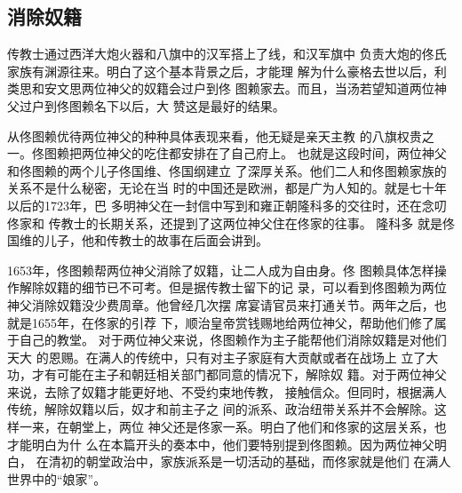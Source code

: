 \subsection{消除奴籍}
\par
传教士通过西洋大炮火器和八旗中的汉军搭上了线，和汉军旗中%
负责大炮的佟氏家族有渊源往来。明白了这个基本背景之后，才能理%
解为什么豪格去世以后，利类思和安文思两位神父的奴籍会过户到佟%
图赖家去。而且，当汤若望知道两位神父过户到佟图赖名下以后，大%
赞这是最好的结果。%
\par
从佟图赖优待两位神父的种种具体表现来看，他无疑是亲天主教%
的八旗权贵之一。佟图赖把两位神父的吃住都安排在了自己府上。%
也就是这段时间，两位神父和佟图赖的两个儿子佟国维、佟国纲建立%
了深厚关系。他们二人和佟图赖家族的关系不是什么秘密，无论在当%
时的中国还是欧洲，都是广为人知的。就是七十年以后的1723年，巴%
多明神父在一封信中写到和雍正朝隆科多的交往时，还在念叨佟家和%
传教士的长期关系，还提到了这两位神父住在佟家的往事。 隆科多%
就是佟国维的儿子，他和传教士的故事在后面会讲到。%
\par
1653年，佟图赖帮两位神父消除了奴籍，让二人成为自由身。佟%
图赖具体怎样操作解除奴籍的细节已不可考。但是据传教士留下的记%
录，可以看到佟图赖为两位神父消除奴籍没少费周章。他曾经几次摆%
席宴请官员来打通关节。两年之后，也就是1655年，在佟家的引荐%
下，顺治皇帝赏钱赐地给两位神父，帮助他们修了属于自己的教堂。%
对于两位神父来说，佟图赖作为主子能帮他们消除奴籍是对他们天大%
的恩赐。在满人的传统中，只有对主子家庭有大贡献或者在战场上%
立了大功，才有可能在主子和朝廷相关部门都同意的情况下，解除奴%
籍。对于两位神父来说，去除了奴籍才能更好地、不受约束地传教，%
接触信众。但同时，根据满人传统，解除奴籍以后，奴才和前主子之%
间的派系、政治纽带关系并不会解除。这样一来，在朝堂上，两位%
神父还是佟家一系。明白了他们和佟家的这层关系，也才能明白为什%
么在本篇开头的奏本中，他们要特别提到佟图赖。因为两位神父明白，%
在清初的朝堂政治中，家族派系是一切活动的基础，而佟家就是他们%
在满人世界中的“娘家”。%
